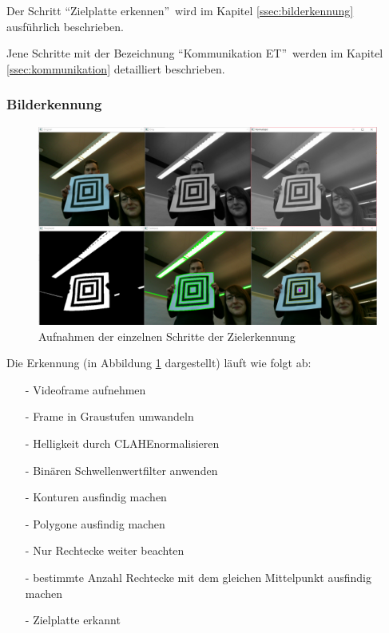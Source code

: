 \documentclass[a4paper]{report}
\begin{document}
Der Schritt \textquotedblleft Zielplatte erkennen\textquotedblright\ wird im Kapitel \ref{ssec:bilderkennung} ausführlich beschrieben.

Jene Schritte mit der Bezeichnung \textquotedblleft Kommunikation ET\textquotedblright\ werden im Kapitel \ref{ssec:kommunikation} detailliert beschrieben.

\subsubsection{Bilderkennung}
\label{ssec:Bilderkennung}

\begin{figure}[h!]
	\centering
	\includegraphics[keepaspectratio,width=\textwidth]{BilderkennungAblauf}
	\caption{Aufnahmen der einzelnen Schritte der Zielerkennung}
	\label{fig:AufnahmeZielerkennung}
\end{figure}

Die Erkennung (in Abbildung \ref{fig:AufnahmeZielerkennung} dargestellt) läuft wie folgt ab:

\begin{itemize}[noitemsep]
	\item[-] Videoframe aufnehmen
	\item[-] Frame in Graustufen umwandeln
	\item[-] Helligkeit durch CLAHE\footnotemark normalisieren
	\item[-] Binären Schwellenwertfilter anwenden
	\item[-] Konturen ausfindig machen
	\item[-] Polygone ausfindig machen
	\item[-] Nur Rechtecke weiter beachten
	\item[-] bestimmte Anzahl Rechtecke mit dem gleichen Mittelpunkt ausfindig machen
	\item[-] Zielplatte erkannt
\end{itemize}
\end{document}
